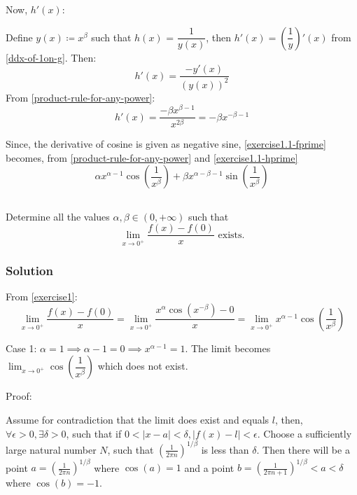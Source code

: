 \documentclass{article}
\begin{document}
Now, $h'(x)$:

Define $y(x) \coloneq x^{\beta}$ such that $h(x)$ = $\dfrac{1}{y(x)}$, then $h'(x)=\left(\dfrac{1}{y}\right)'(x)$ from \cref{ddx-of-1on-g}. Then:
\begin{equation}
	h'(x) = \dfrac{-y'(x)}{(y(x))^2}
\end{equation}
From \cref{product-rule-for-any-power}:
\begin{equation}
	h'(x)=\dfrac{-\beta x^{\beta-1}}{x^{2\beta}}=-\beta x^{-\beta-1} \label{exercise1.1-hprime}
\end{equation}

Since, the derivative of cosine is given as negative sine, \cref{exercise1.1-fprime} becomes, from \cref{product-rule-for-any-power} and
\cref{exercise1.1-hprime}
\begin{equation}
	\alpha x^{\alpha-1}\cos\left(\dfrac{1}{x^\beta}\right)+\beta x^{\alpha-\beta-1}\sin\left(\dfrac{1}{x^{\beta}}\right) \label{exercise1.1-result}
\end{equation}

\subsection{}
Determine all the values $\alpha,\beta \in (0,+\infty)$ such that
\begin{equation*}
	\lim_{x \to 0^+}\dfrac{f(x)-f(0)}{x} \text{ exists.}
\end{equation*}
\subsubsection{Solution}
From \cref{exercise1}:
\begin{equation}
	\lim_{x \to 0^+}\dfrac{f(x)-f(0)}{x} = \lim_{x \to 0^+}\dfrac{x^{\alpha}\cos(x^{-\beta})-0}{x}=\lim_{x \to 0^+}x^{\alpha-1}\cos\left(\dfrac{1}{x^{\beta}}\right)
\end{equation}

Case 1: $\alpha = 1 \implies \alpha-1=0 \implies x^{\alpha-1}=1$. The limit becomes $\lim_{x \to 0^+}\cos\left(\dfrac{1}{x^{\beta}}\right)$
which does not exist.

Proof:

Assume for contradiction that the limit does exist and equals $l$, then, $\forall \epsilon > 0, \exists \delta > 0$, such that if
$0< |x-a| < \delta, |f(x)-l|<\epsilon$. Choose a sufficiently large natural number $N$, such that $(\frac{1}{2\pi n})^{1/\beta}$ is less than $\delta$.
Then there will be a point $a=(\frac{1}{2\pi n})^{1/\beta}$ where $\cos(a)=1$ and a point $b=(\frac{1}{2\pi n+1})^{1/\beta}<a<\delta$ where
$\cos(b)=-1$.
\end{document}
